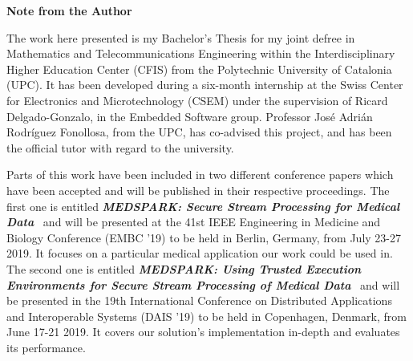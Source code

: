 \vspace*{4cm}
\Huge
\textbf{Note from the Author} \label{sec:acknowledgments}
\normalsize

\vspace{1cm}

The work here presented is my Bachelor's Thesis for my joint defree in Mathematics and Telecommunications Engineering within the Interdisciplinary Higher Education Center (CFIS) from the Polytechnic University of Catalonia (UPC).
It has been developed during a six-month internship at the Swiss Center for Electronics and Microtechnology (CSEM) under the supervision of Ricard Delgado-Gonzalo, in the Embedded Software group.
Professor Jos\'e Adri\'an Rodr\'iguez Fonollosa, from the UPC, has co-advised this project, and has been the official tutor with regard to the university.

Parts of this work have been included in two different conference papers which have been accepted and will be published in their respective proceedings.
The first one is entitled \textbf{\textit{MEDSPARK: Secure Stream Processing for Medical Data}}~\cite{Segarra2019} and will be presented at the 41st IEEE Engineering in Medicine and Biology Conference (EMBC '19) to be held in Berlin, Germany, from July 23-27 2019.
It focuses on a particular medical application our work could be used in.
The second one is entitled \textbf{\textit{MEDSPARK: Using Trusted Execution Environments for Secure Stream Processing of Medical Data}}~\cite{Segarra2019b} and will be presented in the 19th International Conference on Distributed Applications and Interoperable Systems (DAIS '19) to be held in Copenhagen, Denmark, from June 17-21 2019.
It covers our solution's implementation in-depth and evaluates its performance.

%
%

\vspace*{\fill}
